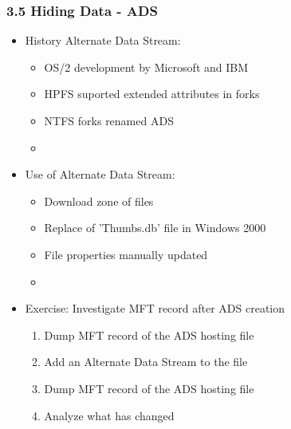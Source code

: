 \begin{frame}[fragile]
  \frametitle{3.5 Hiding Data - ADS}
    \begin{itemize}
       \item History Alternate Data Stream:
       \begin{itemize}
           \item OS/2 development by Microsoft and IBM
           \item HPFS suported extended attributes in forks
           \item NTFS forks renamed ADS
           \item[]
       \end{itemize}
       \item Use of Alternate Data Stream:
       \begin{itemize}
           \item Download zone of files
           \item Replace of 'Thumbs.db' file in Windows 2000
           \item File properties manually updated
           \item[]
       \end{itemize}
       \item Exercise: Investigate MFT record after ADS creation
       \begin{enumerate}
           \item Dump MFT record of the ADS hosting file
           \item Add an Alternate Data Stream to the file
           \item Dump MFT record of the ADS hosting file
           \item Analyze what has changed
       \end{enumerate}
    \end{itemize}
\end{frame}


